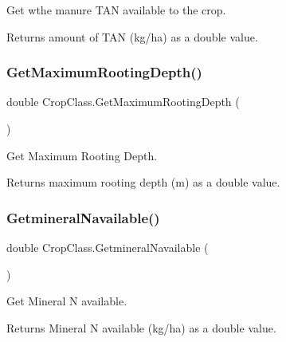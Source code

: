 Get wthe manure T\+AN available to the crop. 

\begin{DoxyReturn}{Returns}
amount of T\+AN (kg/ha) as a double value. 
\end{DoxyReturn}
\mbox{\label{class_crop_class_a4c47e81d7f855b6433e4be443fa27466}} 
\subsubsection{\texorpdfstring{GetMaximumRootingDepth()}{GetMaximumRootingDepth()}}
{\footnotesize\ttfamily double Crop\+Class.\+Get\+Maximum\+Rooting\+Depth (\begin{DoxyParamCaption}{ }\end{DoxyParamCaption})\hspace{0.3cm}{\ttfamily [inline]}}



Get Maximum Rooting Depth. 

\begin{DoxyReturn}{Returns}
maximum rooting depth (m) as a double value. 
\end{DoxyReturn}
\mbox{\label{class_crop_class_a436e6d75754c3cf937610a0b1cd337ea}} 
\subsubsection{\texorpdfstring{GetmineralNavailable()}{GetmineralNavailable()}}
{\footnotesize\ttfamily double Crop\+Class.\+Getmineral\+Navailable (\begin{DoxyParamCaption}{ }\end{DoxyParamCaption})\hspace{0.3cm}{\ttfamily [inline]}}



Get Mineral N available. 

\begin{DoxyReturn}{Returns}
Mineral N available (kg/ha) as a double value. 
\end{DoxyReturn}
\mbox{\label{class_crop_class_ab935be3bbe7d14e94d8be7446e2eec5c}} 
